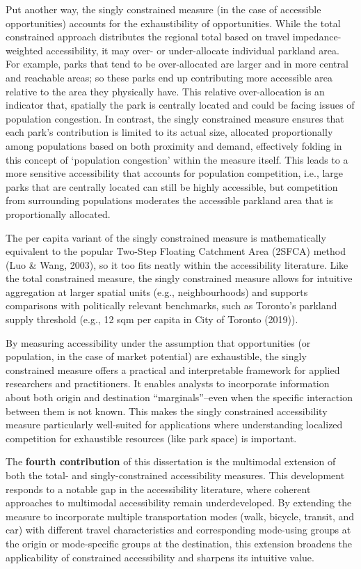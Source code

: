 \documentclass[
11pt, %
oneside, %
english, %
singlespacing, %
]{macthesis} %
\begin{document}
Put another way, the singly constrained measure (in the case of accessible opportunities) accounts for the exhaustibility of opportunities. While the total constrained approach distributes the regional total based on travel impedance-weighted accessibility, it may over- or under-allocate individual parkland area. For example, parks that tend to be over-allocated are larger and in more central and reachable areas; so these parks end up contributing more accessible area relative to the area they physically have. This relative over-allocation is an indicator that, spatially the park is centrally located and could be facing issues of population congestion. In contrast, the singly constrained measure ensures that each park's contribution is limited to its actual size, allocated proportionally among populations based on both proximity and demand, effectively folding in this concept of `population congestion' within the measure itself. This leads to a more sensitive accessibility that accounts for population competition, i.e., large parks that are centrally located can still be highly accessible, but competition from surrounding populations moderates the accessible parkland area that is proportionally allocated.

The per capita variant of the singly constrained measure is mathematically equivalent to the popular Two-Step Floating Catchment Area (2SFCA) method (Luo \& Wang, 2003), so it too fits neatly within the accessibility literature. Like the total constrained measure, the singly constrained measure allows for intuitive aggregation at larger spatial units (e.g., neighbourhoods) and supports comparisons with politically relevant benchmarks, such as Toronto's parkland supply threshold (e.g., 12 sqm per capita in City of Toronto (2019)).

By measuring accessibility under the assumption that opportunities (or population, in the case of market potential) are exhaustible, the singly constrained measure offers a practical and interpretable framework for applied researchers and practitioners. It enables analysts to incorporate information about both origin and destination ``marginals''--even when the specific interaction between them is not known. This makes the singly constrained accessibility measure particularly well-suited for applications where understanding localized competition for exhaustible resources (like park space) is important.

The \textbf{fourth contribution} of this dissertation is the multimodal extension of both the total- and singly-constrained accessibility measures. This development responds to a notable gap in the accessibility literature, where coherent approaches to multimodal accessibility remain underdeveloped. By extending the measure to incorporate multiple transportation modes (walk, bicycle, transit, and car) with different travel characteristics and corresponding mode-using groups at the origin or mode-specific groups at the destination, this extension broadens the applicability of constrained accessibility and sharpens its intuitive value.
\end{document}
